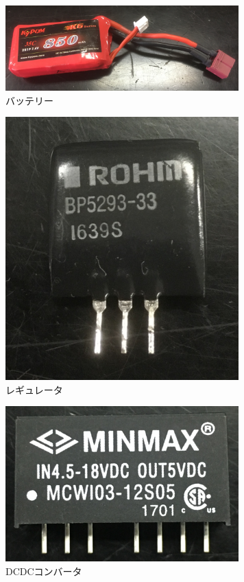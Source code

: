 \documentclass[12pt,oneside]{paper}
\begin{document}
\begin{figure}[H]
\begin{center}
\includegraphics[width=90mm]{ga/bat.jpg}
\end{center}
\caption{バッテリー}
\label{fig:T850/35-2S}
\end{figure}

\begin{figure}[H]
\begin{center}
\includegraphics[width=90mm]{ga/reg.jpg}
\end{center}
\caption{レギュレータ}
\label{fig:P5293-33}
\end{figure}

\begin{figure}[H]
\begin{center}
\includegraphics[width=90mm]{ga/dcdc.jpg}
\end{center}
\caption{DCDCコンバータ}
\label{fig:MCW103-12S05}
\end{figure}
\end{document}
